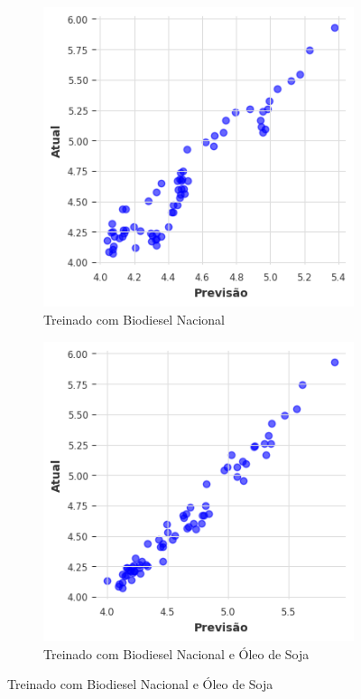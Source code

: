 \begin{figure}[htbp]
	\centering
	\begin{subfigure}[b]{0.40\textwidth}
		\centering
		\includegraphics[width=\textwidth]{figuras/darnn_takens_brasil_scatter.png} %
		\caption{Treinado com Biodiesel Nacional \newline}
		\label{fig:darnn_takens_brasil_scatter}
	\end{subfigure}
	\hfill
	\begin{subfigure}[b]{0.40\textwidth}
		\centering
		\includegraphics[width=\textwidth]{figuras/darnn_takens_brasil_oil_scatter.png} %
		\caption{Treinado com Biodiesel Nacional e Óleo de Soja}
		\label{fig:darnn_takens_brasil_oil_scatter}
	\end{subfigure}


\end{figure}
